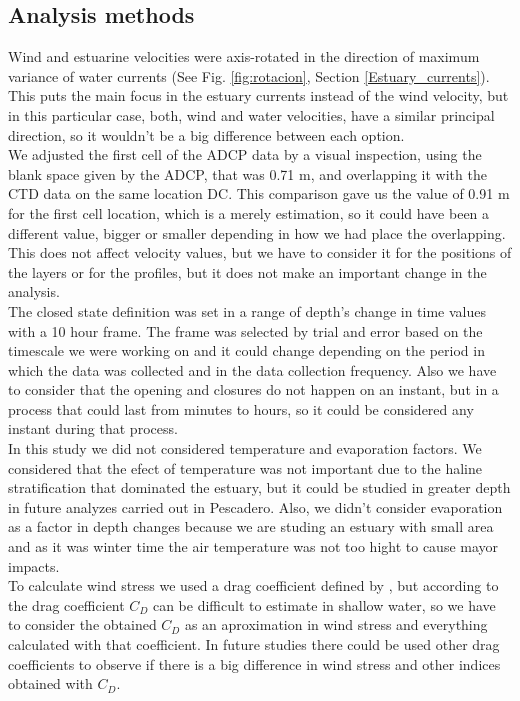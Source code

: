 \documentclass[tesis.tex]{subfiles}
\begin{document}
\subsection{Analysis methods}

Wind and estuarine velocities were axis-rotated in the direction of maximum variance of water currents (See Fig. \ref{fig:rotacion}, Section \ref{Estuary_currents}). This puts the main focus in the estuary currents instead of the wind velocity, but in this particular case, both, wind and water velocities, have a similar principal direction, so it wouldn't be a big difference between each option.\\

We adjusted the first cell of the ADCP data by a visual inspection, using the blank space given by the ADCP, that was 0.71 m, and overlapping it with the CTD data on the same location DC. This comparison gave us the value of 0.91 m for the first cell location, which is a merely estimation, so it could have been a different value, bigger or smaller depending in how we had place the overlapping. This does not affect velocity values, but we have to consider it for the positions of the layers or for the profiles, but it does not make an important change in the analysis.\\

The closed state definition was set in a range of depth's change in time values with a 10 hour frame. The frame was selected by trial and error based on the timescale we were working on and it could change depending on the period in which the data was collected and in the data collection frequency. Also we have to consider that the opening and closures do not happen on an instant, but in a process that could last from minutes to hours, so it could be considered any instant during that process.\\ 

In this study we did not considered temperature and evaporation factors. We considered that the efect of temperature was not important due to the haline stratification that dominated the estuary, but it could be studied in greater depth in future analyzes carried out in Pescadero. Also, we didn't consider evaporation as a factor in depth changes because we are studing an estuary with small area and as it was winter time the air temperature was not too hight to cause mayor impacts.\\

To calculate wind stress we used a drag coefficient defined by \cite{large1981open}, but according to \cite{paugam2021wind} the drag coefficient $C_D$ can be difficult to estimate in shallow water, so we have to consider the obtained $C_D$ as an aproximation in wind stress and everything calculated with that coefficient. In future studies there could be used other drag coefficients to observe if there is a big difference in wind stress and other indices obtained with $C_D$.\\
\end{document}
